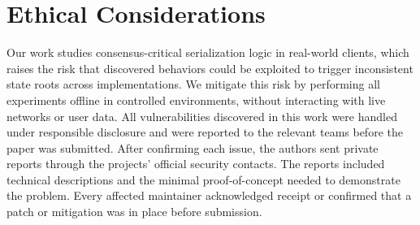 \section{Ethical Considerations}
Our work studies consensus-critical serialization logic in real-world clients, which raises the risk that discovered behaviors could be exploited to trigger inconsistent state roots across implementations. We mitigate this risk by performing all experiments offline in controlled environments, without interacting with live networks or user data. All vulnerabilities discovered in this work were handled under responsible disclosure and were reported to the relevant teams before the paper was submitted. After confirming each issue, the authors sent private reports through the projects' official security contacts. The reports included technical descriptions and the minimal proof-of-concept needed to demonstrate the problem. Every affected maintainer acknowledged receipt or confirmed that a patch or mitigation was in place before submission.
